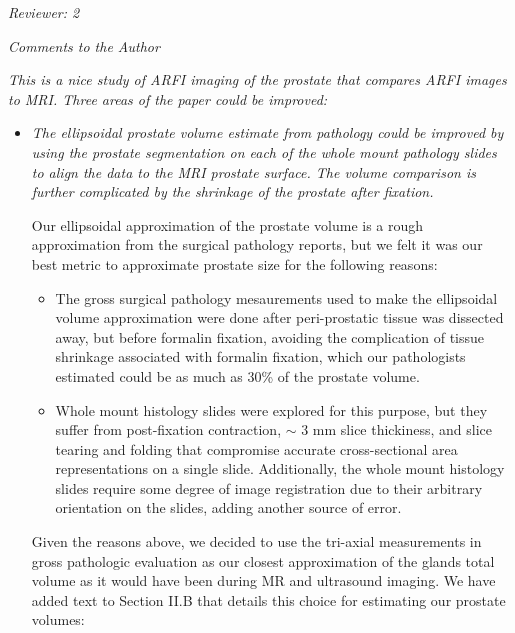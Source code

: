 \documentclass[10pt]{article}
\begin{document}
\textit{Reviewer: 2}

\textit{Comments to the Author}

\textit{This is a nice study of ARFI imaging of the prostate that compares ARFI images
to MRI. Three areas of the paper could be improved:}

\begin{itemize}
    \item \textit{The ellipsoidal prostate volume estimate from pathology could be
        improved by using the prostate segmentation on each of the whole mount
        pathology slides to align the data to the MRI prostate surface. The
        volume comparison is further complicated by the shrinkage of the
        prostate after fixation.}

   Our ellipsoidal approximation of the prostate volume is a rough
   approximation from the surgical pathology reports, but we felt it was our
   best metric to approximate prostate size for the following reasons:

   \begin{itemize}
        \item The gross surgical pathology mesaurements used to make the
            ellipsoidal volume approximation were done after peri-prostatic
            tissue was dissected away, but before formalin fixation, avoiding
            the complication of tissue shrinkage associated with formalin
            fixation, which our pathologists estimated could be as much as 30\%
            of the prostate volume.
        \item Whole mount histology slides were explored for this purpose, but
            they suffer from post-fixation contraction, $\sim$ 3 mm slice
            thickiness, and slice tearing and folding that compromise accurate
            cross-sectional area representations on a single slide.
            Additionally, the whole mount histology slides require some degree
            of image registration due to their arbitrary orientation on the
            slides, adding another source of error.
    \end{itemize}

    Given the reasons above, we decided to use the tri-axial measurements in
    gross pathologic evaluation as our closest approximation of the glands
    total volume as it would have been during MR and ultrasound imaging.  We
    have added text to Section II.B that details this choice for estimating our
    prostate volumes:

    \textbf{}


\end{itemize}
\end{document}
